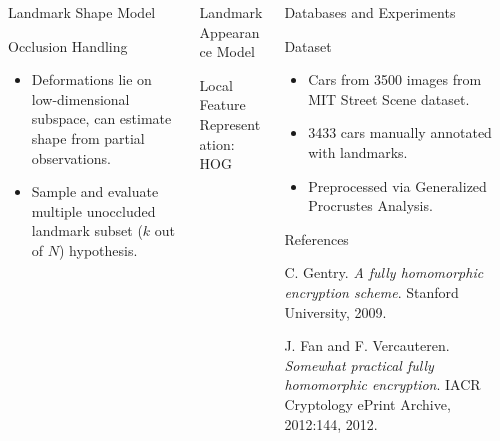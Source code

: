 \documentclass[final,red]{beamer}
\begin{document}
\begin{frame}{}
\begin{columns}[t]
\begin{column}{.3\linewidth}
\begin{block}{Landmark Shape Model}
\begin{exampleblock}{Occlusion Handling}
\end{exampleblock}
  \vspace{-2cm}
  {\tiny
	\begin{itemize}
		\item {\small Deformations lie on low-dimensional subspace, can estimate shape from partial observations.}
    \item {\small Sample and evaluate multiple unoccluded landmark subset ($k$ out of $N$) hypothesis.}
	\end{itemize}}

\end{block}
\end{column}

\begin{column}{.3\linewidth}
\begin{block}{Landmark Appearance Model}

\begin{exampleblock}{Local Feature Representation: HOG}
\end{exampleblock}
\end{block}
\end{column}

\begin{column}{0.3\linewidth}
\begin{block}{Databases and Experiments}
\begin{exampleblock}{Dataset}
\end{exampleblock}

\vspace{-1cm}
\begin{itemize}
\item Cars from 3500 images from MIT Street Scene dataset.
\item 3433 cars manually annotated with landmarks.
\item Preprocessed via Generalized Procrustes Analysis.
\end{itemize}
\end{block}

\begin{block}{References}
\end{block}
\begin{thebibliography}{9}
C. Gentry. \textit{A fully homomorphic encryption scheme}. Stanford University, 2009.
 
J. Fan and F. Vercauteren.
\textit{Somewhat practical fully homomorphic encryption}.
IACR Cryptology ePrint Archive, 2012:144, 2012.
\end{thebibliography}

\end{column}
\end{columns}
\vfill
\end{frame}
\end{document}
